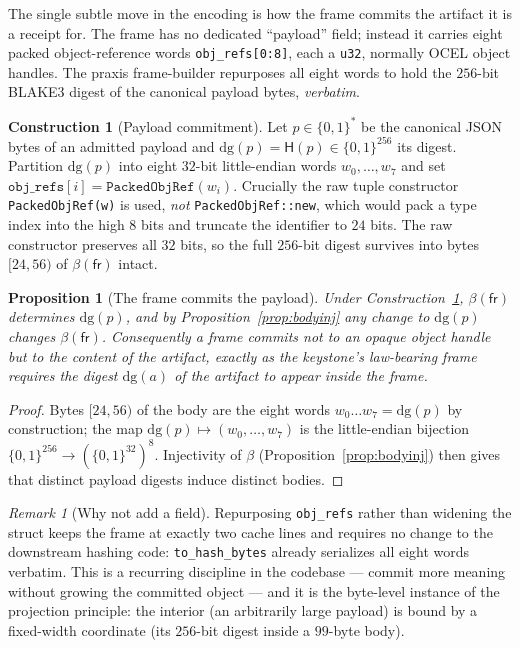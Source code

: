 \documentclass[11pt,oneside]{book}
\theoremstyle{definition}
\newtheorem{construction}{Construction}[chapter]
\theoremstyle{plain}
\newtheorem{proposition}[theorem]{Proposition}
\theoremstyle{remark}
\newtheorem*{remark}{Remark}
\newcommand{\chainH}{\mathsf{H}}               %
\newcommand{\dg}{\mathrm{dg}}                   %
\newcommand{\fr}{\mathsf{fr}}                   %
\newcommand{\body}{\beta}                       %
\newcommand{\code}[1]{\texttt{#1}}
\begin{document}
The single subtle move in the encoding is how the frame commits the artifact it is a receipt
for. The frame has no dedicated ``payload'' field; instead it carries eight packed
object-reference words \code{obj\_refs[0:8]}, each a \code{u32}, normally OCEL object handles.
The praxis frame-builder repurposes all eight words to hold the $256$-bit BLAKE3 digest of the
canonical payload bytes, \emph{verbatim}.

\begin{construction}[Payload commitment]\label{con:commit}
Let $p\in\{0,1\}^{*}$ be the canonical JSON bytes of an admitted payload and $\dg(p)=
\chainH(p)\in\{0,1\}^{256}$ its digest. Partition $\dg(p)$ into eight $32$-bit little-endian
words $w_0,\dots,w_7$ and set $\code{obj\_refs}[i]=\code{PackedObjRef}(w_i)$. Crucially the
raw tuple constructor \code{PackedObjRef(w)} is used, \emph{not} \code{PackedObjRef::new},
which would pack a type index into the high $8$ bits and truncate the identifier to $24$
bits. The raw constructor preserves all $32$ bits, so the full $256$-bit digest survives
into bytes $[24,56)$ of $\body(\fr)$ intact.
\end{construction}

\begin{proposition}[The frame commits the payload]\label{prop:payloadcommit}
Under Construction~\ref{con:commit}, $\body(\fr)$ determines $\dg(p)$, and by
Proposition~\ref{prop:bodyinj} any change to $\dg(p)$ changes $\body(\fr)$. Consequently a
frame commits not to an opaque object handle but to the content of the artifact, exactly as
the keystone's law-bearing frame requires the digest $\dg(a)$ of the artifact to appear
inside the frame.
\end{proposition}

\begin{proof}
Bytes $[24,56)$ of the body are the eight words $w_0\dots w_7=\dg(p)$ by construction; the
map $\dg(p)\mapsto(w_0,\dots,w_7)$ is the little-endian bijection $\{0,1\}^{256}\to
(\{0,1\}^{32})^{8}$. Injectivity of $\body$ (Proposition~\ref{prop:bodyinj}) then gives that
distinct payload digests induce distinct bodies. \end{proof}

\begin{remark}[Why not add a field]
Repurposing \code{obj\_refs} rather than widening the struct keeps the frame at exactly two
cache lines and requires no change to the downstream hashing code: \code{to\_hash\_bytes}
already serializes all eight words verbatim. This is a recurring discipline in the codebase
--- commit more meaning without growing the committed object --- and it is the byte-level
instance of the projection principle: the interior (an arbitrarily large payload) is bound by
a fixed-width coordinate (its $256$-bit digest inside a $99$-byte body).
\end{remark}
\end{document}
